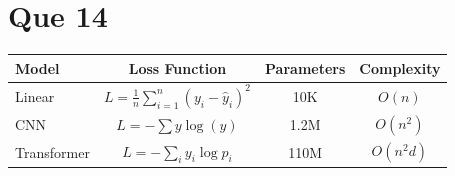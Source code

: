 \documentclass[11pt,a4paper]{article}
\begin{document}
\section*{Que 14}
\begin{center}
\renewcommand{\arraystretch}{2.2}
\begin{tabular}{|l|c|c|c|}
    \hline
    \textbf{Model} & \textbf{Loss Function} & \textbf{Parameters} & \textbf{Complexity} \\
    \hline
    Linear      & $\displaystyle L = \frac{1}{n}\sum_{i=1}^{n}(y_i - \hat{y}_i)^2$ & 10K  & $O(n)$ \\
    \hline
    CNN         & $\displaystyle L = -\sum y \log(\hat{y})$                         & 1.2M & $O(n^2)$ \\
    \hline
    Transformer & $\displaystyle L = -\sum_i y_i \log p_i$                          & 110M & $O(n^2 d)$ \\
    \hline
\end{tabular}
\end{center}
\end{document}
